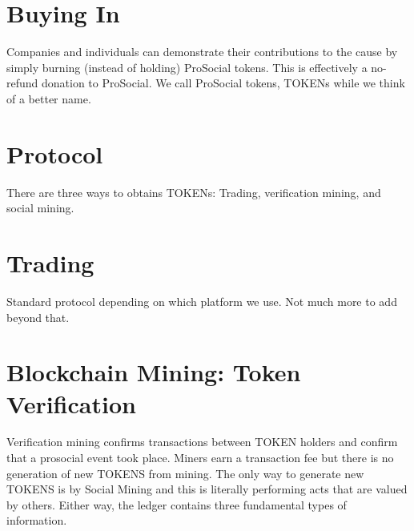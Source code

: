 \section*{Buying In}

Companies and individuals can demonstrate their contributions to the cause by simply burning (instead of holding) ProSocial tokens. This is effectively a no-refund donation to ProSocial. We call ProSocial tokens, TOKENs while we think of a better name. 

\section*{Protocol}

There are three ways to obtains TOKENs: Trading, verification mining, and social mining. 

\section*{Trading}

Standard protocol depending on which platform we use. Not much more to add beyond that.

\section*{Blockchain Mining: Token Verification}

Verification mining confirms transactions between TOKEN holders and confirm that a prosocial event took place. Miners earn a transaction fee but there is no generation of new TOKENS from mining. The only way to generate new TOKENS is by Social Mining and this is literally performing acts that are valued by others. Either way, the ledger contains three fundamental types of information.

